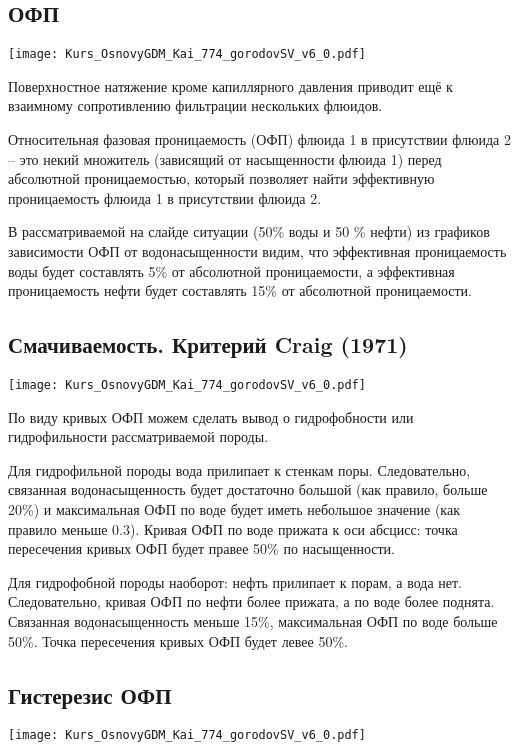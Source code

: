 \documentclass[main.tex]{subfiles}
\begin{document}
\subsection{ОФП}

\texttt{[image: Kurs\_OsnovyGDM\_Kai\_774\_gorodovSV\_v6\_0.pdf]}

Поверхностное натяжение кроме капиллярного давления приводит ещё к взаимному сопротивлению фильтрации нескольких флюидов.

Относительная фазовая проницаемость (ОФП) флюида 1 в присутствии флюида 2 -- это некий множитель (зависящий от насыщенности флюида 1) перед абсолютной проницаемостью, который позволяет найти эффективную проницаемость флюида 1 в присутствии флюида 2.

В рассматриваемой на слайде ситуации (50\% воды и 50 \% нефти) из графиков зависимости ОФП от водонасыщенности видим, что эффективная проницаемость воды будет составлять 5\% от абсолютной проницаемости, а эффективная проницаемость нефти будет составлять 15\% от абсолютной проницаемости.

\subsection{Смачиваемость. Критерий Craig (1971)}

\texttt{[image: Kurs\_OsnovyGDM\_Kai\_774\_gorodovSV\_v6\_0.pdf]}

По виду кривых ОФП можем сделать вывод о гидрофобности или гидрофильности рассматриваемой породы.

Для гидрофильной породы вода прилипает к стенкам поры. Следовательно, связанная водонасыщенность будет достаточно большой (как правило, больше 20\%) и максимальная ОФП по воде будет иметь небольшое значение (как правило меньше 0.3).
Кривая ОФП по воде прижата к оси абсцисс: точка пересечения кривых ОФП будет правее 50\% по насыщенности.

Для гидрофобной породы наоборот: нефть прилипает к порам, а вода нет. Следовательно, кривая ОФП по нефти более прижата, а по воде более поднята.
Связанная водонасыщенность меньше 15\%, максимальная ОФП по воде больше 50\%. Точка пересечения кривых ОФП будет левее 50\%.

\subsection{Гистерезис ОФП}

\texttt{[image: Kurs\_OsnovyGDM\_Kai\_774\_gorodovSV\_v6\_0.pdf]}
\end{document}
